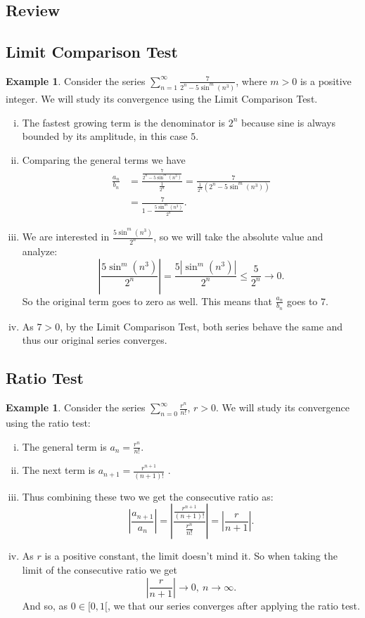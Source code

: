 \documentclass[12pt]{article}
\theoremstyle{plain}
\theoremstyle{definition}
\newtheorem{Ex}[Th]{Example}           %
\theoremstyle{remark}
\renewcommand{\leq}{\leqslant}      %
\renewcommand{\:}{\colon}           %
\renewcommand{\.}{\Cdot}                %
\begin{document}
\begin{multicols}{2}
\section*{Review}

\subsection*{Limit Comparison Test}

\begin{Ex} 
  Consider the series $\displaystyle\sum_{n=1}^\infty \frac{7}{2^n-5\sin^m(n^3)}$, where $m>0$ is a positive integer. We will study its convergence using the Limit Comparison Test. 
  \begin{enumerate}[i)]
    \itemsep=-0.4em
    \item The fastest growing term is the denominator is $2^n$ because sine is always bounded by its amplitude, in this case $5$.
    \item Comparing the general terms we have 
    \begin{align*}
      \frac{a_n}{b_n}&=\frac{\frac{7}{2^n-5\sin^m(n^3)}}{\frac{1}{2^n}}=\frac{7}{\frac{1}{2^n}\left(2^n-5\sin^m(n^3)\right)}\\
      &=\frac{7}{1-\frac{5\sin^m(n^3)}{2^n}}.
    \end{align*}
    \item We are interested in $\frac{5\sin^m(n^3)}{2^n}$, so we will take the absolute value and analyze:
    $$\left|\frac{5\sin^m(n^3)}{2^n}\right|= \frac{5|\sin^m(n^3)|}{2^n}\leq\frac{5}{2^n}\to0.$$
    So the original term goes to zero as well. This means that $\frac{a_n}{b_n}$ goes to $7$.
    \item As $7>0$, by the Limit Comparison Test, both series behave the same and thus our original series converges.
  \end{enumerate}
\end{Ex}

\subsection*{Ratio Test}
\begin{Ex} 
  Consider the series $\displaystyle\sum_{n=0}^\infty \frac{r^n}{n!}$, $r>0$. We will study its convergence using the ratio test:
  \begin{enumerate}[i)]
    \itemsep=-0.4em 
    \item The general term is $a_n=\frac{r^n}{n!}$.
    \item The next term is $a_{n+1}=\frac{r^{n+1}}{(n+1)!}$ .
    \item Thus combining these two we get the consecutive ratio as:
    $$\left|\frac{a_{n+1}}{a_n}\right|=\left|\frac{\frac{r^{n+1}}{(n+1)!}}{\frac{r^n}{n!}}\right|=\left|\frac{r}{n+1}\right|.$$
    \item As $r$ is a positive constant, the limit doesn't mind it. So when taking the limit of the consecutive ratio we get
    $$\left|\frac{r}{n+1}\right|\to 0,\ n\to\infty.$$
    And so, as $0\in[0,1[$, we that our series converges after applying the ratio test.
  \end{enumerate}


\end{Ex}
\end{multicols}
\end{document}
